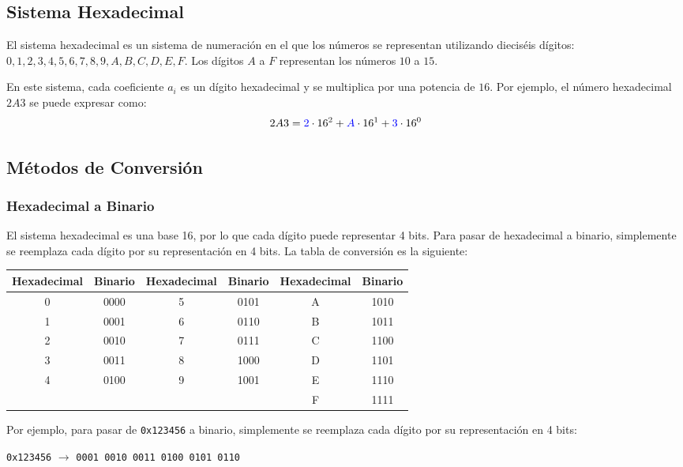 \subsection{Sistema Hexadecimal}
El sistema hexadecimal es un sistema de numeración en el que los números se representan utilizando dieciséis dígitos: $0, 1, 2, 3, 4, 5, 6, 7, 8, 9, A, B, C, D, E, F$. Los dígitos $A$ a $F$ representan los números $10$ a $15$.

En este sistema, cada coeficiente $a_i$ es un dígito hexadecimal y se multiplica por una potencia de $16$. Por ejemplo, el número hexadecimal $2A3$ se puede expresar como:
\begin{equation*}
    2A3 = \textcolor{blue}{2} \cdot 16^2 + \textcolor{blue}{A} \cdot 16^1 + \textcolor{blue}{3} \cdot 16^0
\end{equation*}

\subsection{Métodos de Conversión}
\subsubsection{Hexadecimal a Binario}
El sistema hexadecimal es una base 16, por lo que cada dígito puede representar 4 bits. Para pasar de hexadecimal a binario, simplemente se reemplaza cada dígito por su representación en 4 bits. La tabla de conversión es la siguiente:

\begin{center}
    \begin{tabular}{cccccc} %
       \toprule %
       Hexadecimal & Binario & Hexadecimal & Binario & Hexadecimal & Binario\\
       \midrule %
       0 & 0000 & 5 & 0101 & A & 1010 \\
       1 & 0001 & 6 & 0110 & B & 1011 \\
       2 & 0010 & 7 & 0111 & C & 1100 \\
       3 & 0011 & 8 & 1000 & D & 1101 \\
       4 & 0100 & 9 & 1001 & E & 1110 \\
         &      &   &      & F & 1111 \\
       \bottomrule %
   \end{tabular}
   \end{center}
Por ejemplo, para pasar de \texttt{0x123456} a binario, simplemente se reemplaza cada dígito por su representación en 4 bits:
\begin{center}
    \texttt{0x123456} $\rightarrow$ \texttt{0001 0010 0011 0100 0101 0110}
\end{center}

